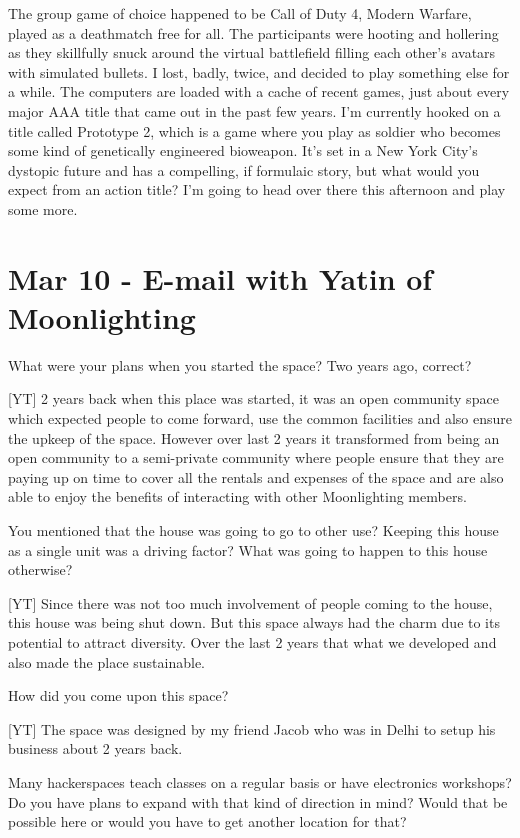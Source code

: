 \documentclass[11pt]{amsart}
\begin{document}
The group game of choice happened to be Call of Duty 4, Modern Warfare, played as a deathmatch free for all. The participants were hooting and hollering as they skillfully snuck around the virtual battlefield filling each other's avatars with simulated bullets. I lost, badly, twice, and decided to play something else for a while. The computers are loaded with a cache of recent games, just about every major AAA title that came out in the past few years. I'm currently hooked on a title called Prototype 2, which is a game where you play as soldier who becomes some kind of genetically engineered bioweapon. It's set in a New York City's dystopic future and has a compelling, if formulaic story, but what would you expect from an action title? I'm going to head over there this afternoon and play some more.

\section{Mar 10 - E-mail with Yatin of Moonlighting}

What were your plans when you started the space? Two years ago, correct?

[YT] 2 years back when this place was started, it was an open community space which expected people to come forward, use the common facilities and also ensure the upkeep of the space. However over last 2 years it transformed from being an open community to a semi-private community where people ensure that they are paying up on time to cover all the rentals and expenses of the space and are also able to enjoy the benefits of interacting with other Moonlighting members.

You mentioned that the house was going to go to other use? Keeping this house as a single unit was a driving factor? What was going to happen to this house otherwise?

[YT] Since there was not too much involvement of people coming to the house, this house was being shut down. But this space always had the charm due to its potential to attract diversity. Over the last 2 years that what we developed and also made the place sustainable.

How did you come upon this space?

[YT] The space was designed by my friend Jacob who was in Delhi to setup his business about 2 years back.

Many hackerspaces teach classes on a regular basis or have electronics workshops? Do you have plans to expand with that kind of direction in mind? Would that be possible here or would you have to get another location for that?
\end{document}
